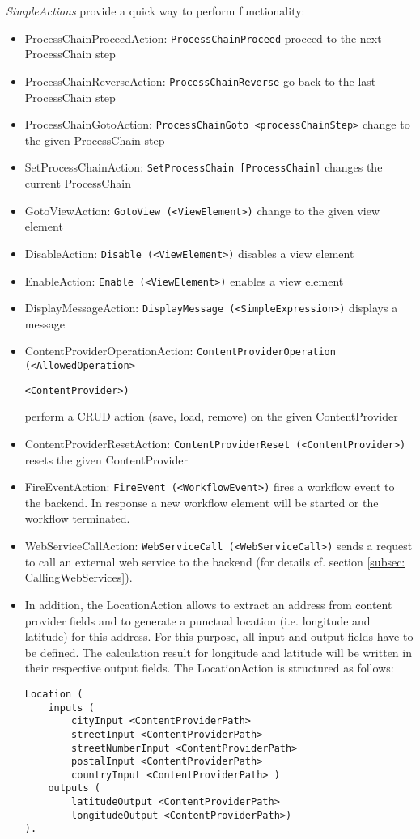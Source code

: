 \textit{SimpleActions} provide a quick way to perform functionality:
\begin{itemize}
\item ProcessChainProceedAction: \lstinline!ProcessChainProceed!
\subitem proceed to the next ProcessChain step
\item ProcessChainReverseAction: \lstinline!ProcessChainReverse!
\subitem go back to the last ProcessChain step
\item ProcessChainGotoAction: \lstinline!ProcessChainGoto <processChainStep>!
\subitem change to the given ProcessChain step
\item SetProcessChainAction: \lstinline!SetProcessChain [ProcessChain]!
\subitem changes the current ProcessChain
\item GotoViewAction: \lstinline!GotoView (<ViewElement>)!
\subitem change to the given view element
\item DisableAction: \lstinline!Disable (<ViewElement>)!
\subitem disables a view element
\item EnableAction: \lstinline!Enable (<ViewElement>)!
\subitem enables a view element
\item DisplayMessageAction: \lstinline!DisplayMessage (<SimpleExpression>)!
\subitem displays a message
\item {ContentProviderOperationAction: \lstinline!ContentProviderOperation (<AllowedOperation>!

 \lstinline!<ContentProvider>)!}
\subitem perform a CRUD action (save, load, remove) on the given ContentProvider
\item ContentProviderResetAction: \lstinline!ContentProviderReset (<ContentProvider>)!
\subitem resets the given ContentProvider
\item FireEventAction: \lstinline!FireEvent (<WorkflowEvent>)!
\subitem fires a workflow event to the backend. In response a new workflow element will be started or the workflow terminated.

\item WebServiceCallAction: \lstinline!WebServiceCall (<WebServiceCall>)!
\subitem sends a request to call an external web service to the backend (for details cf. section \ref{subsec: CallingWebServices}).

\item In addition, the LocationAction allows to extract an address from content provider fields and to generate a punctual location (i.e. longitude and latitude) for this address. For this purpose, all input and output fields have to be defined. The calculation result for longitude and latitude will be written in their respective output fields. The LocationAction is structured as follows:

\begin{lstlisting}
Location (
	inputs (
		cityInput <ContentProviderPath>
		streetInput <ContentProviderPath>
		streetNumberInput <ContentProviderPath>
		postalInput <ContentProviderPath>
		countryInput <ContentProviderPath> )
	outputs (
		latitudeOutput <ContentProviderPath>
		longitudeOutput <ContentProviderPath>)
).
\end{lstlisting}

 
\end{itemize}

